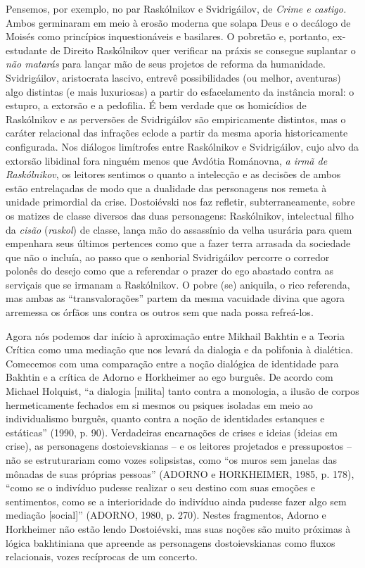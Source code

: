 Pensemos, por exemplo, no par Raskólnikov e Svidrigáilov, de \emph{Crime
e castigo.} Ambos germinaram em meio à erosão moderna que solapa Deus e
o decálogo de Moisés como princípios inquestionáveis e basilares. O
pobretão e, portanto, ex-estudante de Direito Raskólnikov quer verificar
na práxis se consegue suplantar o \emph{não matarás} para lançar mão de
seus projetos de reforma da humanidade. Svidrigáilov, aristocrata
lascivo, entrevê possibilidades (ou melhor, aventuras) algo distintas (e
mais luxuriosas) a partir do esfacelamento da instância moral: o
estupro, a extorsão e a pedofilia. É bem verdade que os homicídios de
Raskólnikov e as perversões de Svidrigáilov são empiricamente distintos,
mas o caráter relacional das infrações eclode a partir da mesma aporia
historicamente configurada. Nos diálogos limítrofes entre Raskólnikov e
Svidrigáilov, cujo alvo da extorsão libidinal fora ninguém menos que
Avdótia Románovna, \emph{a irmã de Raskólnikov}, os leitores sentimos o
quanto a intelecção e as decisões de ambos estão entrelaçadas de modo
que a dualidade das personagens nos remeta à unidade primordial da
crise. Dostoiévski nos faz refletir, subterraneamente, sobre os matizes
de classe diversos das duas personagens: Raskólnikov, intelectual filho
da \emph{cisão} (\emph{raskol}) de classe, lança mão do assassínio da
velha usurária para quem empenhara seus últimos pertences como que a
fazer terra arrasada da sociedade que não o incluía, ao passo que o
senhorial Svidrigáilov percorre o corredor polonês do desejo como que a
referendar o prazer do ego abastado contra as serviçais que se irmanam a
Raskólnikov. O pobre (se) aniquila, o rico referenda, mas ambas as
``transvalorações'' partem da mesma vacuidade divina que agora arremessa
os órfãos uns contra os outros sem que nada possa refreá-los.

Agora nós podemos dar início à aproximação entre Mikhail Bakhtin e a
Teoria Crítica como uma mediação que nos levará da dialogia e da
polifonia à dialética. Comecemos com uma comparação entre a noção
dialógica de identidade para Bakhtin e a crítica de Adorno e Horkheimer
ao ego burguês. De acordo com Michael Holquist, ``a dialogia
{[}milita{]} tanto contra a monologia, a ilusão de corpos hermeticamente
fechados em si mesmos ou psiques isoladas em meio ao individualismo
burguês, quanto contra a noção de identidades estanques e estáticas''
(1990, p. 90). Verdadeiras encarnações de crises e ideias (ideias em
crise), as personagens dostoievskianas -- e os leitores projetados e
pressupostos -- não se estruturariam como vozes solipsistas, como ``os
muros sem janelas das mônadas de suas próprias pessoas'' (ADORNO e
HORKHEIMER, 1985, p. 178), ``como se o indivíduo pudesse realizar o seu
destino com suas emoções e sentimentos, como se a interioridade do
indivíduo ainda pudesse fazer algo sem mediação {[}social{]}'' (ADORNO,
1980, p. 270). Nestes fragmentos, Adorno e Horkheimer não estão lendo
Dostoiévski, mas suas noções são muito próximas à lógica bakhtiniana que
apreende as personagens dostoievskianas como fluxos relacionais, vozes
recíprocas de um concerto.


